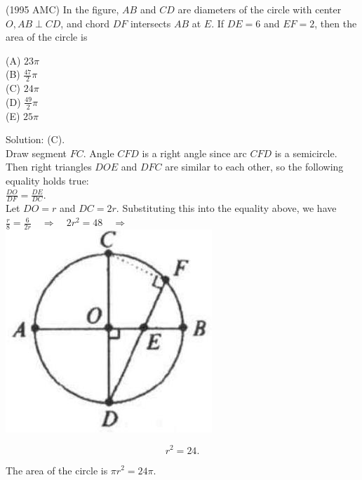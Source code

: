 \documentclass{article}
\begin{document}
(1995 AMC) In the figure, \(A B\) and \(C D\) are diameters of the circle with center \(O, A B \perp C D\), and chord \(D F\) intersects \(A B\) at \(E\). If \(D E=6\) and \(E F=2\), then the area of the circle is


(A) \(23 \pi\)\\
(B) \(\frac{47}{2} \pi\)\\
(C) \(24 \pi\)\\
(D) \(\frac{49}{2} \pi\)\\
(E) \(25 \pi\)

Solution: (C).\\
Draw segment \(F C\). Angle \(C F D\) is a right angle since arc \(C F D\) is a semicircle. Then right triangles \(D O E\) and \(D F C\) are similar to each other, so the following equality holds true:\\
\(\frac{D O}{D F}=\frac{D E}{D C}\).\\
Let \(D O=r\) and \(D C=2 r\). Substituting this into the equality above, we have \(\frac{r}{8}=\frac{6}{2 r} \quad \Rightarrow \quad 2 r^{2}=48 \quad \Rightarrow\)\\
\centering
\includegraphics[width=\textwidth]{images/167(1).jpg}

\[
r^{2}=24 .
\]

The area of the circle is \(\pi r^{2}=24 \pi\).
\end{document}
